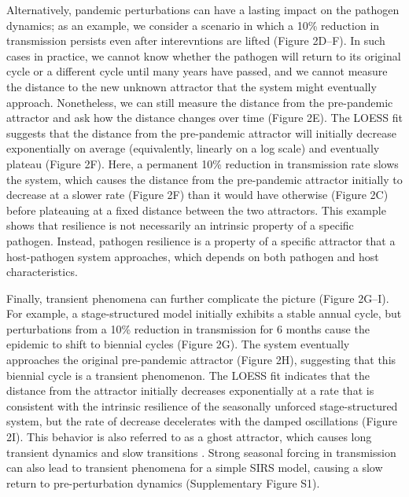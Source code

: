 \documentclass[12pt]{article}
\newcommand{\comment}{\showcomment}
\newcommand{\showcomment}[3]{\textcolor{#1}{\textbf{[#2: }\textsl{#3}\textbf{]}}}
\newcommand{\swp}[1]{\comment{magenta}{SWP}{#1}}
\begin{document}
Alternatively, pandemic perturbations can have a lasting impact on the pathogen dynamics; 
as an example, we consider a scenario in which a 10\% reduction in transmission persists even after interevntions are lifted (Figure 2D--F).
In such cases in practice, we cannot know whether the pathogen will return to its original cycle or a different cycle until many years have passed, and we cannot measure the distance to the new unknown attractor that the system might eventually approach.
Nonetheless, we can still measure the distance from the pre-pandemic attractor and ask how the distance changes over time (Figure 2E).
The LOESS fit suggests that the distance from the pre-pandemic attractor will initially decrease exponentially on average (equivalently, linearly on a log scale) and eventually plateau (Figure 2F).
Here, a permanent 10\% reduction in transmission rate slows the system, which causes the distance from the pre-pandemic attractor initially to decrease at a slower rate (Figure 2F) than it would have otherwise (Figure 2C) before plateauing at a fixed distance between the two attractors.
This example shows that resilience is not necessarily an intrinsic property of a specific pathogen.
Instead, pathogen resilience is a property of a specific attractor that a host-pathogen system approaches, which depends on both pathogen and host characteristics.

Finally, transient phenomena can further complicate the picture (Figure 2G--I).
For example, a stage-structured model initially exhibits a stable annual cycle, but perturbations from a 10\% reduction in transmission for 6 months cause the epidemic to shift to biennial cycles (Figure 2G).
The system eventually approaches the original pre-pandemic attractor (Figure 2H), suggesting that this biennial cycle is a transient phenomenon.
The LOESS fit indicates that the distance from the attractor initially decreases exponentially at a rate that is consistent with the intrinsic resilience of the seasonally unforced stage-structured system, but the rate of decrease decelerates with the damped oscillations (Figure 2I).
This behavior is also referred to as a ghost attractor, which causes long transient dynamics and slow transitions \citep{hastings2018transient}.
Strong seasonal forcing in transmission can also lead to transient phenomena for a simple SIRS model, causing a slow return to pre-perturbation dynamics (Supplementary Figure S1).
\end{document}
